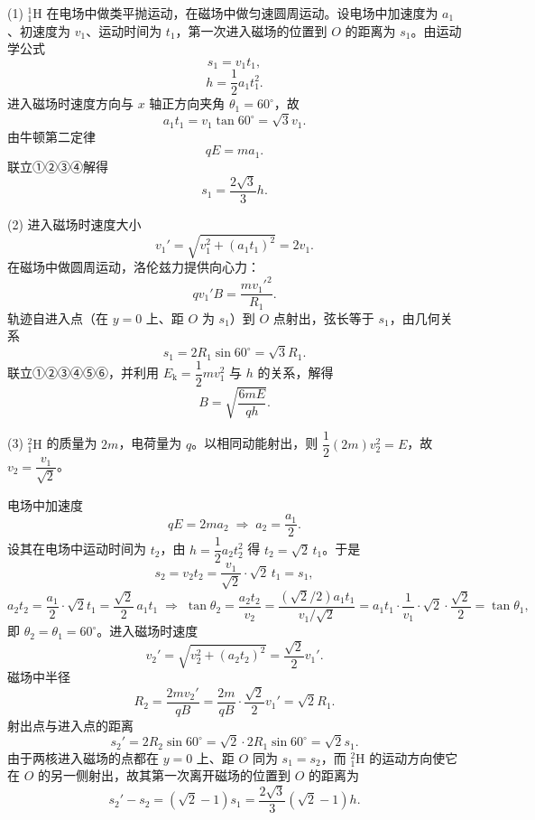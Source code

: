 \begin{answer}
(1) ${}_{1}^{1}\mathrm{H}$ 在电场中做类平抛运动，在磁场中做匀速圆周运动。设电场中加速度为 $a_{1}$、初速度为 $v_{1}$、运动时间为 $t_{1}$，第一次进入磁场的位置到 $O$ 的距离为 $s_{1}$。由运动学公式
\[
  s_{1}=v_{1}t_{1}, \tag{①}
\]
\[
  h=\frac{1}{2}a_{1}t_{1}^{2}. \tag{②}
\]
进入磁场时速度方向与 $x$ 轴正方向夹角 $\theta_{1}=60^{\circ}$，故
\[
  a_{1}t_{1}=v_{1}\tan 60^{\circ}=\sqrt{3}v_{1}. \tag{③}
\]
由牛顿第二定律
\[
  qE=ma_{1}. \tag{④}
\]
联立①②③④解得
\[
  s_{1}=\frac{2\sqrt{3}}{3}h.
\]

(2) 进入磁场时速度大小
\[
  v_{1}'=\sqrt{v_{1}^{2}+(a_{1}t_{1})^{2}}=2v_{1}.
\]
在磁场中做圆周运动，洛伦兹力提供向心力：
\[
  qv_{1}'B=\frac{mv_{1}'^{2}}{R_{1}}. \tag{⑤}
\]
轨迹自进入点（在 $y=0$ 上、距 $O$ 为 $s_{1}$）到 $O$ 点射出，弦长等于 $s_{1}$，由几何关系
\[
  s_{1}=2R_{1}\sin 60^{\circ}=\sqrt{3}R_{1}. \tag{⑥}
\]
联立①②③④⑤⑥，并利用 $E_{\mathrm{k}}=\dfrac{1}{2}m v_{1}^{2}$ 与 $h$ 的关系，解得
\[
  B=\sqrt{\frac{6mE}{qh}}.
\]

(3) ${}_{1}^{2}\mathrm{H}$ 的质量为 $2m$，电荷量为 $q$。以相同动能射出，则 $\dfrac{1}{2}(2m)v_{2}^{2}=E$，故 $v_{2}=\dfrac{v_{1}}{\sqrt{2}}$。

电场中加速度
\[
  qE=2ma_{2}\;\Longrightarrow\;a_{2}=\frac{a_{1}}{2}.
\]
设其在电场中运动时间为 $t_{2}$，由 $h=\dfrac{1}{2}a_{2}t_{2}^{2}$ 得 $t_{2}=\sqrt{2}\,t_{1}$。于是
\[
  s_{2}=v_{2}t_{2}=\frac{v_{1}}{\sqrt{2}}\cdot\sqrt{2}\,t_{1}=s_{1},
\]
\[
  a_{2}t_{2}=\frac{a_{1}}{2}\cdot\sqrt{2}t_{1}=\frac{\sqrt{2}}{2}\,a_{1}t_{1}
  \;\Longrightarrow\;
  \tan\theta_{2}=\frac{a_{2}t_{2}}{v_{2}}=\frac{(\sqrt{2}/2)a_{1}t_{1}}{v_{1}/\sqrt{2}}=a_{1}t_{1}\cdot\frac{1}{v_{1}}\cdot\sqrt{2}\cdot\frac{\sqrt{2}}{2}=\tan\theta_{1},
\]
即 $\theta_{2}=\theta_{1}=60^{\circ}$。进入磁场时速度
\[
  v_{2}'=\sqrt{v_{2}^{2}+(a_{2}t_{2})^{2}}=\frac{\sqrt{2}}{2}v_{1}'.
\]
磁场中半径
\[
  R_{2}=\frac{2mv_{2}'}{qB}=\frac{2m}{qB}\cdot\frac{\sqrt{2}}{2}v_{1}'=\sqrt{2}R_{1}.
\]
射出点与进入点的距离
\[
  s_{2}'=2R_{2}\sin 60^{\circ}=\sqrt{2}\cdot 2R_{1}\sin60^{\circ}=\sqrt{2}s_{1}.
\]
由于两核进入磁场的点都在 $y=0$ 上、距 $O$ 同为 $s_{1}=s_{2}$，而 ${}_{1}^{2}\mathrm{H}$ 的运动方向使它在 $O$ 的另一侧射出，故其第一次离开磁场的位置到 $O$ 的距离为
\[
  s_{2}'-s_{2}=\left(\sqrt{2}-1\right)s_{1}=\frac{2\sqrt{3}}{3}\left(\sqrt{2}-1\right)h.
\]
\end{answer}

